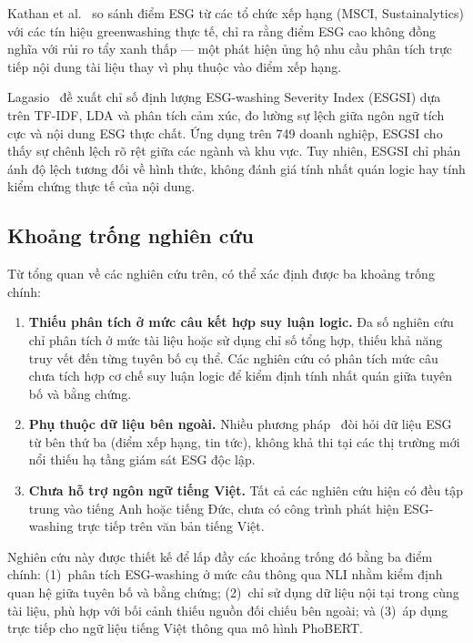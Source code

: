 Kathan et al.~\cite{kathan2025you} so sánh điểm ESG từ các tổ chức xếp hạng (MSCI, Sustainalytics) với các tín hiệu greenwashing thực tế, chỉ ra rằng điểm ESG cao không đồng nghĩa với rủi ro tẩy xanh thấp --- một phát hiện ủng hộ nhu cầu phân tích trực tiếp nội dung tài liệu thay vì phụ thuộc vào điểm xếp hạng.

Lagasio~\cite{lagasio2024esg} đề xuất chỉ số định lượng ESG-washing Severity Index (ESGSI) dựa trên TF-IDF, LDA và phân tích cảm xúc, đo lường sự lệch giữa ngôn ngữ tích cực và nội dung ESG thực chất. Ứng dụng trên 749 doanh nghiệp, ESGSI cho thấy sự chênh lệch rõ rệt giữa các ngành và khu vực. Tuy nhiên, ESGSI chỉ phản ánh độ lệch tương đối về hình thức, không đánh giá tính nhất quán logic hay tính kiểm chứng thực tế của nội dung.


\subsection{Khoảng trống nghiên cứu}
\label{subsec:rw_gap}
Từ tổng quan về các nghiên cứu trên, có thể xác định được ba khoảng trống chính:

\begin{enumerate}
    \item \textbf{Thiếu phân tích ở mức câu kết hợp suy luận logic.} Đa số nghiên cứu chỉ phân tích ở mức tài liệu hoặc sử dụng chỉ số tổng hợp, thiếu khả năng truy vết đến từng tuyên bố cụ thể. Các nghiên cứu có phân tích mức câu~\cite{florstedt2025detecting, zhao2023detecting} chưa tích hợp cơ chế suy luận logic để kiểm định tính nhất quán giữa tuyên bố và bằng chứng.

    \item \textbf{Phụ thuộc dữ liệu bên ngoài.} Nhiều phương pháp~\cite{lipenkova2023detecting, kathan2025you} đòi hỏi dữ liệu ESG từ bên thứ ba (điểm xếp hạng, tin tức), không khả thi tại các thị trường mới nổi thiếu hạ tầng giám sát ESG độc lập.

    \item \textbf{Chưa hỗ trợ ngôn ngữ tiếng Việt.} Tất cả các nghiên cứu hiện có đều tập trung vào tiếng Anh hoặc tiếng Đức, chưa có công trình phát hiện ESG-washing trực tiếp trên văn bản tiếng Việt.
\end{enumerate}

Nghiên cứu này được thiết kế để lấp đầy các khoảng trống đó bằng ba điểm chính: (1)~phân tích ESG-washing ở mức câu thông qua NLI nhằm kiểm định quan hệ giữa tuyên bố và bằng chứng; (2)~chỉ sử dụng dữ liệu nội tại trong cùng tài liệu, phù hợp với bối cảnh thiếu nguồn đối chiếu bên ngoài; và (3)~áp dụng trực tiếp cho ngữ liệu tiếng Việt thông qua mô hình PhoBERT.
